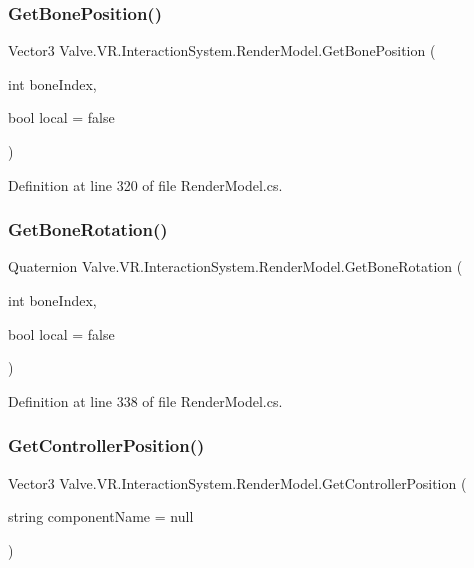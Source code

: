 \subsubsection{\texorpdfstring{GetBonePosition()}{GetBonePosition()}}
{\footnotesize\ttfamily Vector3 Valve.\+V\+R.\+Interaction\+System.\+Render\+Model.\+Get\+Bone\+Position (\begin{DoxyParamCaption}\item[{int}]{bone\+Index,  }\item[{bool}]{local = {\ttfamily false} }\end{DoxyParamCaption})}



Definition at line 320 of file Render\+Model.\+cs.

\mbox{\label{class_valve_1_1_v_r_1_1_interaction_system_1_1_render_model_ad2a03fc8955758e248e85e8a920a80d0}} 
\subsubsection{\texorpdfstring{GetBoneRotation()}{GetBoneRotation()}}
{\footnotesize\ttfamily Quaternion Valve.\+V\+R.\+Interaction\+System.\+Render\+Model.\+Get\+Bone\+Rotation (\begin{DoxyParamCaption}\item[{int}]{bone\+Index,  }\item[{bool}]{local = {\ttfamily false} }\end{DoxyParamCaption})}



Definition at line 338 of file Render\+Model.\+cs.

\mbox{\label{class_valve_1_1_v_r_1_1_interaction_system_1_1_render_model_a304ff9471420fda69c51fd10184ae9dd}} 
\subsubsection{\texorpdfstring{GetControllerPosition()}{GetControllerPosition()}}
{\footnotesize\ttfamily Vector3 Valve.\+V\+R.\+Interaction\+System.\+Render\+Model.\+Get\+Controller\+Position (\begin{DoxyParamCaption}\item[{string}]{component\+Name = {\ttfamily null} }\end{DoxyParamCaption})}



